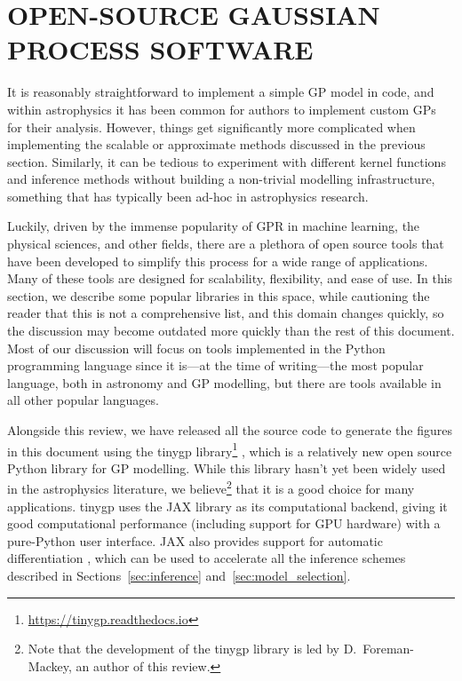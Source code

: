 \documentclass[letterpaper]{ar-1col}
\newcommand{\project}[1]{\textsf{#1}}
\begin{document}
\section{OPEN-SOURCE GAUSSIAN PROCESS SOFTWARE}
\label{sec:open}

It is reasonably straightforward to implement a simple GP model in code, and within astrophysics it has been common for authors to implement custom GPs for their analysis.
However, things get significantly more complicated when implementing the scalable or approximate methods discussed in the previous section.
Similarly, it can be tedious to experiment with different kernel functions and inference methods without building a non-trivial modelling infrastructure, something that has typically been ad-hoc in astrophysics research.

Luckily, driven by the immense popularity of GPR in machine learning, the physical sciences, and other fields, there are a plethora of open source tools that have been developed to simplify this process for a wide range of applications.
Many of these tools are designed for scalability, flexibility, and ease of use.
In this section, we describe some popular libraries in this space, while cautioning the reader that this is not a comprehensive list, and this domain changes quickly, so the discussion may become outdated more quickly than the rest of this document.
Most of our discussion will focus on tools implemented in the \project{Python} programming language since it is---at the time of writing---the most popular language, both in astronomy and GP modelling, but there are tools available in all other popular languages.

Alongside this review, we have released all the source code to generate the figures in this document using the \project{tinygp} library\footnote{\url{https://tinygp.readthedocs.io}} \citep{tinygp}, which is a relatively new open source \project{Python} library for GP modelling.
While this library hasn't yet been widely used in the astrophysics literature, we believe\footnote{Note that the development of the \project{tinygp} library is led by D.\ Foreman-Mackey, an author of this review.} that it is a good choice for many applications.
\project{tinygp} uses the \project{JAX} library as its computational backend, giving it good computational performance (including support for GPU hardware) with a pure-\project{Python} user interface.
\project{JAX} also provides support for automatic differentiation \citep[e.g.,][]{autodiff}, which can be used to accelerate all the inference schemes described in Sections~\ref{sec:inference} and~\ref{sec:model_selection}.
\end{document}

